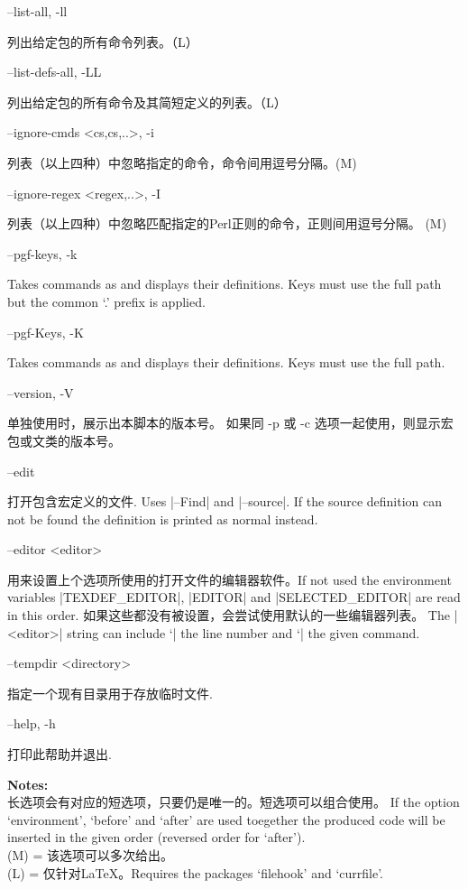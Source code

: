\documentclass{article}
\newenvironment{options}{%
    \def\cstart{\begingroup\ttfamily\par\noindent\ignorespaces}%
    \def\csep{\endgroup\begingroup\list {}{}\item \relax}%
    \def\cend{\endlist\par\medskip\endgroup\cstart}%
    \cstart
}{%
    \endgroup
}
\begin{document}
\begin{options}
  --list-all, -ll                                    \csep 列出给定包的所有命令列表。（L）\cend
  --list-defs-all, -LL                               \csep 列出给定包的所有命令及其简短定义的列表。（L）\cend
  --ignore-cmds \MacroArgs<cs,cs,..>,  -i            \csep 列表（以上四种）中忽略指定的命令，命令间用逗号分隔。(M)\cend
  --ignore-regex \MacroArgs<regex,..>, -I            \csep 列表（以上四种）中忽略匹配指定的Perl正则的命令，正则间用逗号分隔。 (M)\cend
  --pgf-keys, -k                                     \csep Takes commands as  and displays their definitions. Keys must use the full path but the common `.\@cmd' prefix is applied.\cend
  --pgf-Keys, -K                                     \csep Takes commands as  and displays their definitions. Keys must use the full path.\cend
  --version, -V                                      \csep 单独使用时，展示出本脚本的版本号。
                                                       如果同 -p 或 -c 选项一起使用，则显示宏包或文类的版本号。\cend
  --edit                                             \csep 打开包含宏定义的文件. Uses |--Find| and |--source|.
                                                           If the source definition can not be found the definition is printed as normal instead. \cend
  --editor <editor>                                  \csep 用来设置上个选项所使用的打开文件的编辑器软件。If not used the environment variables |TEXDEF_EDITOR|, |EDITOR| and
                                                       |SELECTED_EDITOR| are read in this order. 如果这些都没有被设置，会尝试使用默认的一些编辑器列表。
                                                       The |<editor>| string can include `|%
                                                       the line number and `|%
                                                       the given command.\cend
  --tempdir <directory>                              \csep 指定一个现有目录用于存放临时文件.\cend
  --help, -h                                         \csep 打印此帮助并退出.\cend
\end{options}

\noindent \textbf{Notes:}\\
长选项会有对应的短选项，只要仍是唯一的。短选项可以组合使用。
 If the option `environment', `before' and `after' are used toegether the
 produced code will be inserted in the given order (reversed order for `after').\\
 (M) = 该选项可以多次给出。\\
 (L) = 仅针对LaTeX。Requires the packages `filehook' and `currfile'.
\end{document}

